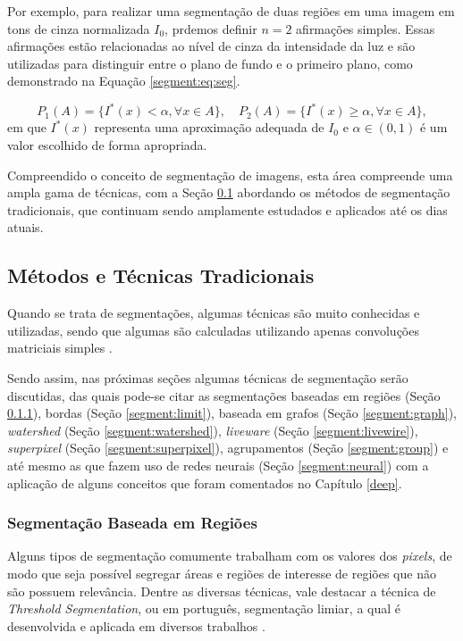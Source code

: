 Por exemplo, para realizar uma segmentação de duas regiões em uma imagem em tons de cinza normalizada $I_0$, prdemos definir $n = 2$ afirmações simples. Essas afirmações estão relacionadas ao nível de cinza da intensidade da luz e são utilizadas para distinguir entre o plano de fundo e o primeiro plano, como demonstrado na Equação \ref{segment:eq:seg}.

\begin{equation}
\label{segment:eq:seg}
    P_1(A) = \{ I^\ast(x) < \alpha, \forall x \in A \}, \quad P_2(A) = \{ I^\ast(x) \geq \alpha, \forall x \in A \},
\end{equation}
em que $I^\ast(x)$ representa uma aproximação adequada de $I_0$ e $\alpha \in (0,1)$ é um valor escolhido de forma apropriada.

Compreendido o conceito de segmentação de imagens, esta área compreende uma ampla gama de técnicas, com a Seção \ref{segment:segment} abordando os métodos de segmentação tradicionais, que continuam sendo amplamente estudados e aplicados até os dias atuais.

\subsection{Métodos e Técnicas Tradicionais}
\label{segment:segment}

Quando se trata de segmentações, algumas técnicas são muito conhecidas e utilizadas, sendo que algumas são calculadas utilizando apenas convoluções matriciais simples \citep{Yuheng2017}.

Sendo assim, nas próximas seções algumas técnicas de segmentação serão discutidas, das quais pode-se citar as segmentações baseadas em regiões (Seção \ref{segment:region}), bordas  (Seção \ref{segment:limit}), baseada em grafos (Seção \ref{segment:graph}), \textit{watershed} (Seção \ref{segment:watershed}), \textit{liveware} (Seção \ref{segment:livewire}), \textit{superpixel} (Seção \ref{segment:superpixel}), agrupamentos (Seção \ref{segment:group}) e até mesmo as que fazem uso de redes neurais  (Seção \ref{segment:neural}) com a aplicação de alguns conceitos que foram comentados no Capítulo \ref{deep}.

\subsubsection{Segmentação Baseada em Regiões}
\label{segment:region}

Alguns tipos de segmentação comumente trabalham com os valores dos \textit{pixels}, de modo que seja possível segregar áreas e regiões de interesse de regiões que não são possuem relevância. Dentre as diversas técnicas, vale destacar a técnica de \textit{Threshold Segmentation}, ou em português, segmentação limiar, a qual é desenvolvida e aplicada em diversos trabalhos \citep{Yanowitz1989}.

